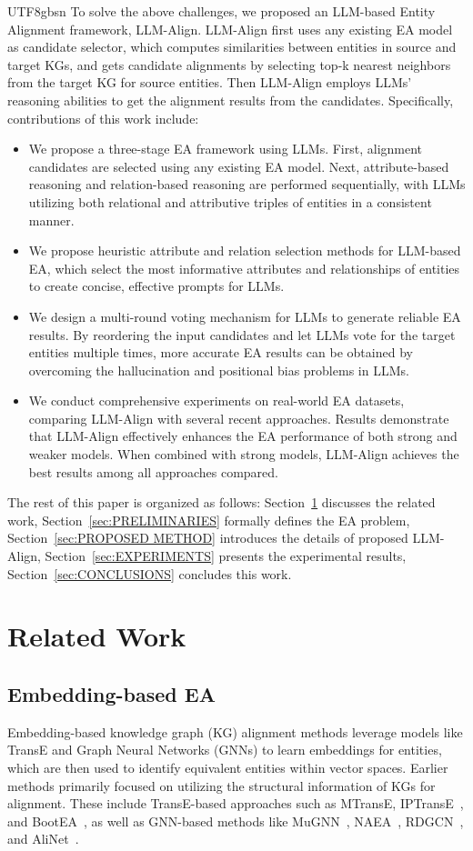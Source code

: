 \documentclass[preprint,12pt]{elsarticle}
\begin{document}
\begin{CJK}{UTF8}{gbsn}
To solve the above challenges, we proposed an LLM-based Entity Alignment framework, LLM-Align. LLM-Align first uses any existing EA model as candidate selector, which computes similarities between entities in source and target KGs, and gets candidate alignments by selecting top-k nearest neighbors from the target KG for source entities. Then LLM-Align employs LLMs' reasoning abilities to get the alignment results from the candidates. Specifically, contributions of this work include:
\begin{itemize}
    \item We propose a three-stage EA framework using LLMs. First, alignment candidates are selected using any existing EA model. Next, attribute-based reasoning and relation-based reasoning are performed sequentially, with LLMs utilizing both relational and attributive triples of entities in a consistent manner.
    \item We propose heuristic attribute and relation selection methods for LLM-based EA, which select the most informative attributes and relationships of entities to create concise, effective prompts for LLMs.
    \item We design a multi-round voting mechanism for LLMs to generate reliable EA results. By reordering the input candidates and let LLMs vote for the target entities multiple times, more accurate EA results can be obtained by overcoming the hallucination and positional bias problems in LLMs.
    \item We conduct comprehensive experiments on real-world EA datasets, comparing LLM-Align with several recent approaches. Results demonstrate that LLM-Align effectively enhances the EA performance of both strong and weaker models. When combined with strong models, LLM-Align achieves the best results among all approaches compared.
\end{itemize}

The rest of this paper is organized as follows: 
Section~\ref{sec:RELATED WORK} discusses the related work,
Section~\ref{sec:PRELIMINARIES} formally defines the EA problem,
Section~\ref{sec:PROPOSED METHOD} introduces the details of proposed LLM-Align,
Section~\ref{sec:EXPERIMENTS} presents the experimental results, Section~\ref{sec:CONCLUSIONS} concludes this work.

\section{Related Work}
\label{sec:RELATED WORK}
\subsection{Embedding-based EA}
Embedding-based knowledge graph (KG) alignment methods leverage models like TransE and Graph Neural Networks (GNNs) to learn embeddings for entities, which are then used to identify equivalent entities within vector spaces. Earlier methods primarily focused on utilizing the structural information of KGs for alignment. These include TransE-based approaches such as MTransE, IPTransE~\cite{zhu2017iterative}, and BootEA~\cite{bootea}, as well as GNN-based methods like MuGNN~\cite{mugnn}, NAEA~\cite{naea}, RDGCN~\cite{rdgcn}, and AliNet~\cite{AliNet}.


\end{CJK}
\end{document}
